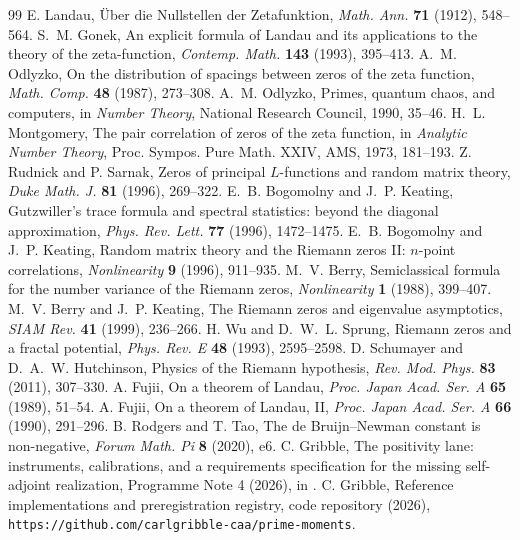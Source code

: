 \documentclass[11pt]{article}
\theoremstyle{definition}
\theoremstyle{remark}
\begin{document}
\begin{thebibliography}{99}
 E. Landau, \"Uber die Nullstellen der Zetafunktion, \emph{Math. Ann.} \textbf{71}
(1912), 548--564.
 S.~M. Gonek, An explicit formula of Landau and its applications to the theory of
the zeta-function, \emph{Contemp. Math.} \textbf{143} (1993), 395--413.
 A.~M. Odlyzko, On the distribution of spacings between zeros of the zeta
function, \emph{Math. Comp.} \textbf{48} (1987), 273--308.
 A.~M. Odlyzko, Primes, quantum chaos, and computers, in \emph{Number
Theory}, National Research Council, 1990, 35--46.
 H.~L. Montgomery, The pair correlation of zeros of the zeta function, in
\emph{Analytic Number Theory}, Proc. Sympos. Pure Math. XXIV, AMS, 1973, 181--193.
 Z. Rudnick and P. Sarnak, Zeros of principal $L$-functions and random
matrix theory, \emph{Duke Math. J.} \textbf{81} (1996), 269--322.
 E.~B. Bogomolny and J.~P. Keating, Gutzwiller's trace formula and spectral
statistics: beyond the diagonal approximation, \emph{Phys. Rev. Lett.} \textbf{77} (1996),
1472--1475.
 E.~B. Bogomolny and J.~P. Keating, Random matrix theory and the Riemann zeros II:
$n$-point correlations, \emph{Nonlinearity} \textbf{9} (1996), 911--935.
 M.~V. Berry, Semiclassical formula for the number variance of the Riemann
zeros, \emph{Nonlinearity} \textbf{1} (1988), 399--407.
 M.~V. Berry and J.~P. Keating, The Riemann zeros and eigenvalue
asymptotics, \emph{SIAM Rev.} \textbf{41} (1999), 236--266.
 H. Wu and D.~W.~L. Sprung, Riemann zeros and a fractal potential, \emph{Phys.
Rev. E} \textbf{48} (1993), 2595--2598.
 D. Schumayer and D.~A.~W. Hutchinson, Physics of the Riemann hypothesis,
\emph{Rev. Mod. Phys.} \textbf{83} (2011), 307--330.
 A. Fujii, On a theorem of Landau, \emph{Proc. Japan Acad. Ser. A} \textbf{65}
(1989), 51--54.
 A. Fujii, On a theorem of Landau, II, \emph{Proc. Japan Acad. Ser. A}
\textbf{66} (1990), 291--296.
 B. Rodgers and T. Tao, The de Bruijn--Newman constant is non-negative,
\emph{Forum Math. Pi} \textbf{8} (2020), e6.
 C. Gribble, The positivity lane: instruments, calibrations, and a requirements
specification for the missing self-adjoint realization, Programme Note 4 (2026), in \cite{Code}.
 C. Gribble, Reference implementations and preregistration registry, code
repository (2026), \texttt{https://github.com/carlgribble-caa/prime-moments}.
\end{thebibliography}
\end{document}
